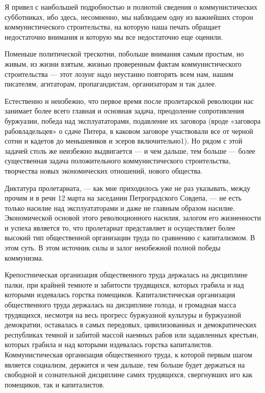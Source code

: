 \documentclass[12pt]{article}
\newcommand{\parnum}{(\arabic{parcount})}
\newcounter{parcount}
\newenvironment{parnumbers}{%
  \par%
  \everypar{\noindent \stepcounter{parcount}\marginpar[]{\parnum}}%
}{}
\begin{document}
\begin{parnumbers}
  Я привел с наибольшей подробностью и полнотой сведения о коммунистических субботниках, ибо здесь, несомненно, мы наблюдаем одну из важнейших сторон коммунистического строительства, на которую наша печать обращает недостаточно внимания и которую мы все недостаточно еще оценили.

Поменьше политической трескотни, побольше внимания самым простым, но живым, из жизни взятым, жизнью проверенным фактам коммунистического строительства — этот лозунг надо неустанно повторять всем нам, нашим писателям, агитаторам, пропагандистам, организаторам и так далее.

Естественно и неизбежно, что первое время после пролетарской революции нас занимает более всего главная и основная задача, преодоление сопротивления буржуазии, победа над эксплуататорами, подавление их заговора (вроде «заговора рабовладельцев» о сдаче Питера, в каковом заговоре участвовали все от черной сотни и кадетов до меньшевиков и эсеров включительно1). Но рядом с этой задачей столь же неизбежно выдвигается — и чем дальше, тем больше — более существенная задача положительного коммунистического строительства, творчества новых экономических отношений, нового общества.

Диктатура пролетариата, — как мне приходилось уже не раз указывать, между прочим и в речи 12 марта на заседании Петроградского Совдепа, — не есть только насилие над эксплуататорами и даже не главным образом насилие. Экономической основой этого революционного насилия, залогом его жизненности и успеха является то, что пролетариат представляет и осуществляет более высокий тип общественной организации труда по сравнению с капитализмом. В этом суть. В этом источник силы и залог неизбежной полной победы коммунизма.

Крепостническая организация общественного труда держалась на дисциплине палки, при крайней темноте и забитости трудящихся, которых грабила и над которыми издевалась горстка помещиков. Капиталистическая организация общественного труда держалась на дисциплине голода, и громадная масса трудящихся, несмотря на весь прогресс буржуазной культуры и буржуазной демократии, оставалась в самых передовых, цивилизованных и демократических республиках темной и забитой массой наемных рабов или задавленных крестьян, которых грабила и над которыми издевалась горстка капиталистов. Коммунистическая организация общественного труда, к которой первым шагом является социализм, держится и чем дальше, тем больше будет держаться на свободной и сознательной дисциплине самих трудящихся, свергнувших иго как помещиков, так и капиталистов.


\end{parnumbers}
\end{document}
